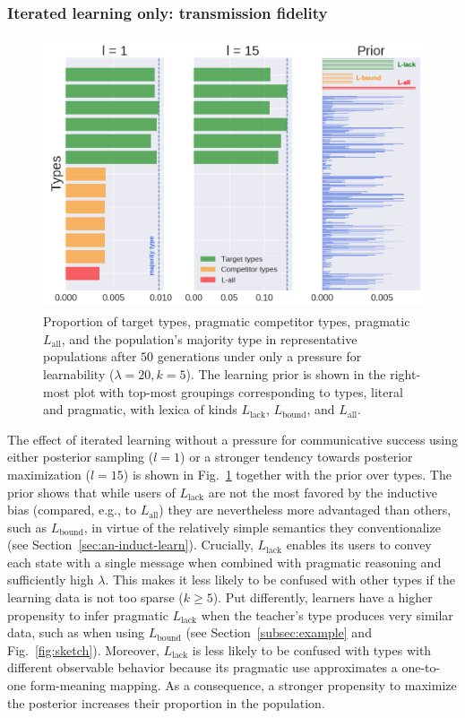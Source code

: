 \documentclass[a4paper, 11pt]{article}
\theoremstyle{Satz}
\newcommand{\hl}[1]{\textcolor[rgb]{.8,.33,.0}{#1}}%
\newcommand{\mylang}[1]{\ensuremath{L_{\text{#1}}}\xspace} %
\newcommand{\Lall}{\mylang{all}}
\newcommand{\Lbound}{\mylang{bound}}
\newcommand{\Llack}{\mylang{lack}}
\begin{document}
\subsubsection{Iterated learning only: transmission fidelity}

\begin{figure}[t]
\centering
\includegraphics[width=1\textwidth,height=8cm,keepaspectratio]{./plots/barh-onlym}

\caption{Proportion of target types, \hl{pragmatic competitor} types, \hl{pragmatic} $\Lall$, and the population's majority type in representative populations after $50$ generations under only a
  pressure for learnability ($\lambda = 20, k = 5$). The learning prior is shown in the
  right-most plot with top-most groupings corresponding to types, literal and pragmatic, with
  lexica of kinds $\Llack$, $\Lbound$, and $\Lall$.}
\label{fig:only-M}
\end{figure}

The effect of iterated learning without a pressure for communicative success using either posterior
sampling ($l = 1$) or a stronger tendency towards posterior maximization ($l = 15$) is shown in
Fig.~\ref{fig:only-M} together with the prior over types. The prior shows that while users of
$\Llack$ are not the most favored by the inductive bias (compared, e.g., to $\Lall$) they are
nevertheless more advantaged than others, such as $\Lbound$, in virtue of the relatively simple
semantics they conventionalize (see Section~\ref{sec:an-induct-learn}). Crucially, $\Llack$
enables its users to convey each state with a single message when combined with pragmatic
reasoning and sufficiently high $\lambda$. This makes it less likely to be confused with
other types if the learning data is not too sparse ($k \geq 5$). Put differently, learners have
a higher propensity to infer pragmatic $\Llack$ when the teacher's type produces very similar
data, such as when using $\Lbound$ (see Section~\ref{subsec:example} and Fig.~\ref{fig:sketch}). Moreover, $\Llack$ is less likely to be confused with
types with different observable behavior because its pragmatic use approximates a one-to-one
form-meaning mapping. As a consequence, a stronger propensity to maximize the posterior
increases their proportion in the population.
\end{document}
